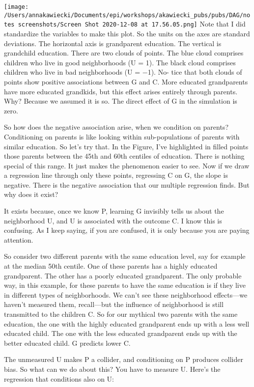 \documentclass[
]{article}
\begin{document}
\texttt{[image: /Users/annakawiecki/Documents/epi/workshops/akawiecki\_pubs/pubs/DAG/notes screenshots/Screen Shot 2020-12-08 at 17.56.05.png]}
Note that I did standardize the variables to make this plot. So the
units on the axes are standard deviations. The horizontal axis is
grandparent education. The vertical is grandchild education. There are
two clouds of points. The blue cloud comprises children who live in good
neighborhoods (U = 1). The black cloud comprises children who live in
bad neighborhoods (U = −1). No- tice that both clouds of points show
positive associations between G and C. More educated grandparents have
more educated grandkids, but this effect arises entirely through
parents. Why? Because we assumed it is so. The direct effect of G in the
simulation is zero.

So how does the negative association arise, when we condition on
parents? Conditioning on parents is like looking within sub-populations
of parents with similar education. So let's try that. In the Figure,
I've highlighted in filled points those parents between the 45th and
60th centiles of education. There is nothing special of this range. It
just makes the phenomenon easier to see. Now if we draw a regression
line through only these points, regressing C on G, the slope is
negative. There is the negative association that our multiple regression
finds. But why does it exist?

It exists because, once we know P, learning G invisibly tells us about
the neighborhood U, and U is associated with the outcome C. I know this
is confusing. As I keep saying, if you are confused, it is only because
you are paying attention.

So consider two different parents with the same education level, say for
example at the median 50th centile. One of these parents has a highly
educated grandparent. The other has a poorly educated grandparent. The
only probable way, in this example, for these parents to have the same
education is if they live in different types of neighborhoods. We can't
see these neighborhood effects---we haven't measured them, recall---but
the influence of neighborhood is still transmitted to the children C. So
for our mythical two parents with the same education, the one with the
highly educated grandparent ends up with a less well educated child. The
one with the less educated grandparent ends up with the better educated
child. G predicts lower C.

The unmeasured U makes P a collider, and conditioning on P produces
collider bias. So what can we do about this? You have to measure U.
Here's the regression that conditions also on U:
\end{document}
